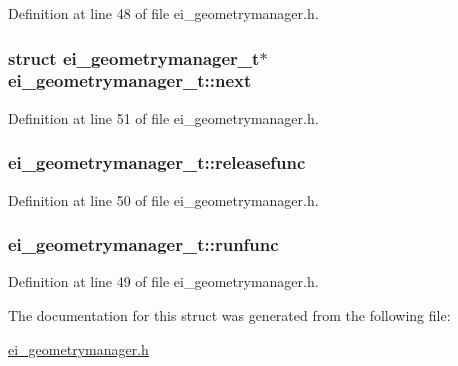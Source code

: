 Definition at line 48 of file ei\-\_\-geometrymanager.\-h.

\hypertarget{structei__geometrymanager__t_a5ac5b387d05d2fd7dcb81bb1572a2200}{
\subsubsection[{next}]{\setlength{\rightskip}{0pt plus 5cm}struct {\bf ei\-\_\-geometrymanager\-\_\-t}$\ast$ ei\-\_\-geometrymanager\-\_\-t\-::next}}\label{structei__geometrymanager__t_a5ac5b387d05d2fd7dcb81bb1572a2200}


Definition at line 51 of file ei\-\_\-geometrymanager.\-h.

\hypertarget{structei__geometrymanager__t_adb7afc019219b29a9751b56da5a23b93}{
\subsubsection[{releasefunc}]{ ei\-\_\-geometrymanager\-\_\-t\-::releasefunc}}\label{structei__geometrymanager__t_adb7afc019219b29a9751b56da5a23b93}


Definition at line 50 of file ei\-\_\-geometrymanager.\-h.

\hypertarget{structei__geometrymanager__t_a49ab7a4f7b357bdd515a8e7affccdba0}{
\subsubsection[{runfunc}]{ ei\-\_\-geometrymanager\-\_\-t\-::runfunc}}\label{structei__geometrymanager__t_a49ab7a4f7b357bdd515a8e7affccdba0}


Definition at line 49 of file ei\-\_\-geometrymanager.\-h.



The documentation for this struct was generated from the following file\-:\begin{DoxyCompactItemize}
\item 
\hyperlink{ei__geometrymanager_8h}{ei\-\_\-geometrymanager.\-h}\end{DoxyCompactItemize}
